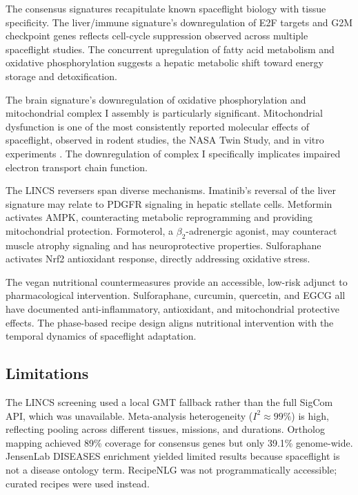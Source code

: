 \documentclass[11pt,a4paper]{article}
\begin{document}
The consensus signatures recapitulate known spaceflight biology with tissue specificity. The 
liver/immune signature's downregulation of E2F targets and G2M checkpoint genes reflects cell-cycle 
suppression observed across multiple spaceflight studies. The concurrent upregulation of fatty acid 
metabolism and oxidative phosphorylation suggests a hepatic metabolic shift toward energy storage 
and detoxification.

The brain signature's downregulation of oxidative phosphorylation and mitochondrial complex I assembly 
is particularly significant. Mitochondrial dysfunction is one of the most consistently reported 
molecular effects of spaceflight, observed in rodent studies, the NASA Twin Study, and in vitro 
experiments \citep{garrett2019nasa}. The downregulation of complex I specifically implicates impaired 
electron transport chain function.

The LINCS reversers span diverse mechanisms. Imatinib's reversal of the liver signature may relate 
to PDGFR signaling in hepatic stellate cells. Metformin activates AMPK, counteracting metabolic 
reprogramming and providing mitochondrial protection. Formoterol, a $\beta_2$-adrenergic agonist, 
may counteract muscle atrophy signaling and has neuroprotective properties. Sulforaphane activates 
Nrf2 antioxidant response, directly addressing oxidative stress.

The vegan nutritional countermeasures provide an accessible, low-risk adjunct to pharmacological 
intervention. Sulforaphane, curcumin, quercetin, and EGCG all have documented anti-inflammatory, 
antioxidant, and mitochondrial protective effects. The phase-based recipe design aligns nutritional 
intervention with the temporal dynamics of spaceflight adaptation.

\subsection{Limitations}
The LINCS screening used a local GMT fallback rather than the full SigCom API, which was unavailable. 
Meta-analysis heterogeneity ($I^2 \approx 99\%$) is high, reflecting pooling across different tissues, 
missions, and durations. Ortholog mapping achieved 89\% coverage for consensus genes but only 39.1\% 
genome-wide. JensenLab DISEASES enrichment yielded limited results because spaceflight is not a 
disease ontology term. RecipeNLG was not programmatically accessible; curated recipes were used instead.

\end{document}

